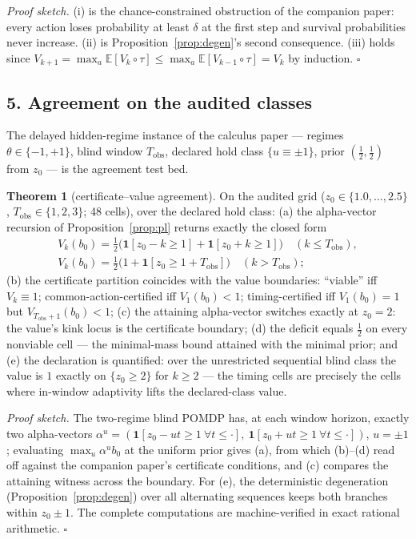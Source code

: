 \documentclass[10pt,twocolumn]{article}
\theoremstyle{definition}
\newtheorem{theorem}{Theorem}
\begin{document}
\emph{Proof sketch.} (i) is the chance-constrained obstruction of the
companion paper: every action loses probability at least \(\delta\) at the
first step and survival probabilities never increase. (ii) is
Proposition~\ref{prop:degen}'s second consequence. (iii) holds since
\(V_{k+1} = \max_a \mathbb{E}[V_{k} \circ \tau] \le \max_a \mathbb{E}
[V_{k-1} \circ \tau] = V_{k}\) by induction.
\hfill\(\square\)

\subsection{5. Agreement on the audited classes}\label{agreement}

The delayed hidden-regime instance of the calculus paper --- regimes
\(\theta \in \{-1, +1\}\), blind window \(T_{\mathrm{obs}}\), declared hold
class \(\{u \equiv \pm 1\}\), prior \((\tfrac12, \tfrac12)\) from
\(z_{0}\) --- is the agreement test bed.

\begin{theorem}[certificate--value agreement]\label{thm:agree}
On the audited grid (\(z_{0} \in \{1.0, \dots, 2.5\}\),
\(T_{\mathrm{obs}} \in \{1,2,3\}\); 48 cells), over the declared hold
class: (a) the alpha-vector recursion of Proposition~\ref{prop:pl} returns
exactly the closed form
\begin{gather*}
V_{k}(b_{0}) = \tfrac{1}{2}\bigl(\mathbf{1}[z_{0} - k \ge 1] +
\mathbf{1}[z_{0} + k \ge 1]\bigr) \quad (k \le T_{\mathrm{obs}}),\\
V_{k}(b_{0}) = \tfrac{1}{2}\bigl(1 + \mathbf{1}[z_{0} \ge 1 +
T_{\mathrm{obs}}]\bigr) \quad (k > T_{\mathrm{obs}});
\end{gather*}
(b) the certificate partition coincides with the value boundaries:
``viable'' iff \(V_{k} \equiv 1\); common-action-certified iff
\(V_{1}(b_{0}) < 1\); timing-certified iff \(V_{1}(b_{0}) = 1\) but
\(V_{T_{\mathrm{obs}}+1}(b_{0}) < 1\);
(c) the attaining alpha-vector switches exactly at \(z_{0} = 2\): the
value's kink locus is the certificate boundary;
(d) the deficit equals \(\tfrac12\) on every nonviable cell --- the
minimal-mass bound attained with the minimal prior; and
(e) the declaration is quantified: over the unrestricted sequential blind
class the value is \(1\) exactly on \(\{ z_{0} \ge 2 \}\) for
\(k \ge 2\) --- the timing cells are precisely the cells where in-window
adaptivity lifts the declared-class value.
\end{theorem}

\emph{Proof sketch.} The two-regime blind POMDP has, at each window
horizon, exactly two alpha-vectors \(\alpha^{u} = (\mathbf{1}[z_{0} - u t
\ge 1\ \forall t \le \cdot],\ \mathbf{1}[z_{0} + u t \ge 1\ \forall t \le
\cdot])\), \(u = \pm 1\); evaluating \(\max_{u} \alpha^{u} b_{0}\) at the
uniform prior gives (a), from which (b)--(d) read off against the
companion paper's certificate conditions, and (c) compares the attaining
witness across the boundary. For (e), the deterministic degeneration
(Proposition~\ref{prop:degen}) over all alternating sequences keeps both
branches within \(z_{0} \pm 1\). The complete computations are
machine-verified in exact rational arithmetic. \hfill\(\square\)
\end{document}
